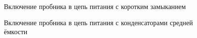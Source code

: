 \begin{figure}[H]
  \captionsetup{singlelinecheck=true} %
  \caption{Включение пробника в цепь питания с коротким замыканием} \label{p:report_powe_stend_kz}
\end{figure}

\begin{figure}[H]
  \captionsetup{singlelinecheck=true} %
  \caption{Включение пробника в цепь питания с конденсаторами средней ёмкости} \label{p:report_powe_stend_norm_low_capasitor}
\end{figure}

